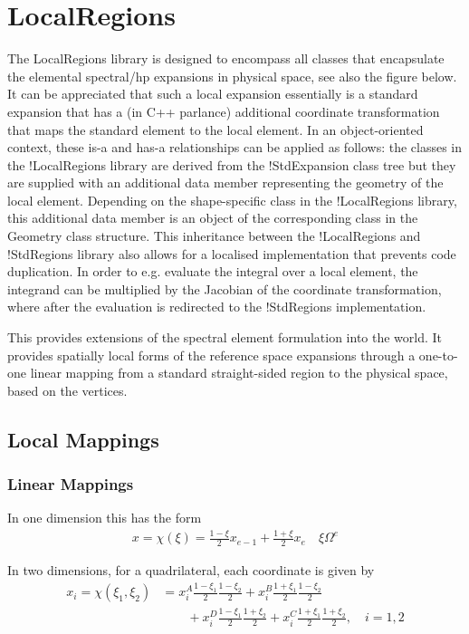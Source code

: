 \section{LocalRegions}
The LocalRegions library is designed to encompass all classes that encapsulate
the elemental spectral/hp expansions in physical space, see also the figure
below. It can be appreciated that such a local expansion essentially is a
standard expansion that has a (in C++ parlance) additional coordinate
transformation that maps the standard element to the local element. In an
object-oriented context, these is-a and has-a relationships can be applied as
follows: the classes in the !LocalRegions library are derived from the
{!StdExpansion} class tree but they are supplied with an additional data member
representing the geometry of the local element. Depending on the shape-specific
class in the !LocalRegions library, this additional data member is an object of
the corresponding class in the Geometry class structure. This inheritance
between the !LocalRegions and !StdRegions library also allows for a localised
implementation that prevents code duplication. In order to e.g. evaluate the
integral over a local element, the integrand can be multiplied by the Jacobian
of the coordinate transformation, where after the evaluation is redirected to
the !StdRegions implementation.

This provides extensions of the spectral element formulation into the world. It
provides spatially local forms of the reference space expansions through a
one-to-one linear mapping from a standard straight-sided region to the physical
space, based on the vertices.

\subsection{Local Mappings}

\subsubsection{Linear Mappings}
In one dimension this has the form
\begin{align*}
x = \chi(\xi) = \frac{1-\xi}{2}x_{e-1} + \frac{1+\xi}{2}x_e \quad \xi
\Omega^e
\end{align*}

In two dimensions, for a quadrilateral, each coordinate is given by
\begin{align*}
x_i = \chi(\xi_1,\xi_2) &= x_i^A\frac{1-\xi_1}{2}\frac{1-\xi_2}{2} +
x_i^B\frac{1+\xi_1}{2}\frac{1-\xi_2}{2} \\ &\qquad+
x_i^D\frac{1-\xi_1}{2}\frac{1+\xi_2}{2} +
x_i^C\frac{1+\xi_1}{2}\frac{1+\xi_2}{2}, \quad i=1,2
\end{align*}


